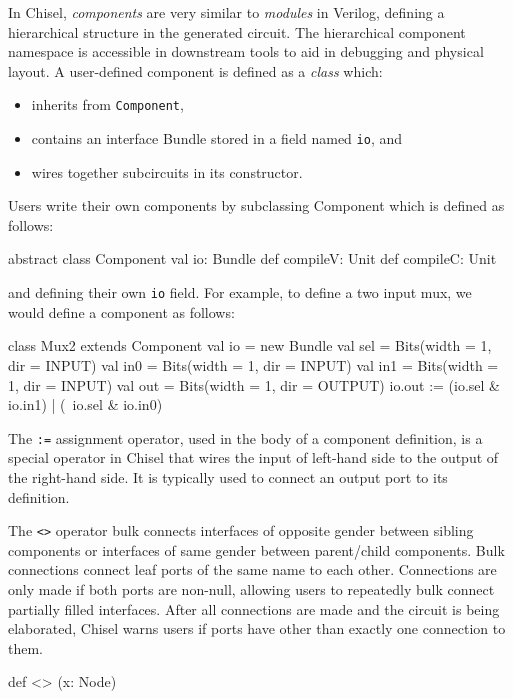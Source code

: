 \documentclass[10pt,twocolumn]{article}
\def\code#1{{\small\tt #1}}
\begin{document}
In Chisel, {\em components} are very similar to {\em modules} in
Verilog, defining a hierarchical structure in the generated circuit.
The hierarchical component namespace is accessible in downstream tools
to aid in debugging and physical layout.  A user-defined component is
defined as a {\em class} which:
\begin{itemize}
\item inherits from \code{Component},
\item contains an interface Bundle stored in a field named \code{io}, and
\item wires together subcircuits in its constructor.
\end{itemize}

Users write their own components by subclassing Component which is
defined as follows:

\begin{scala}
abstract class Component {
  val io: Bundle
  def compileV: Unit
  def compileC: Unit
}
\end{scala}

\noindent
and defining their own \code{io} field.  For example, to define a two
input mux, we would define a component as follows:

\begin{scala}
class Mux2 extends Component {
  val io = new Bundle{
    val sel = Bits(width = 1, dir = INPUT)
    val in0 = Bits(width = 1, dir = INPUT)
    val in1 = Bits(width = 1, dir = INPUT)
    val out = Bits(width = 1, dir = OUTPUT)
  }
  io.out := (io.sel & io.in1) | (~io.sel & io.in0)
}
\end{scala}

\noindent
The \code{:=} assignment operator, used in the body of a
component definition, is a special operator in Chisel that wires the input of
left-hand side to the output of the right-hand side.  It is typically
used to connect an output port to its definition.

The \code{<>} operator bulk connects interfaces of opposite gender between
sibling components or interfaces of same gender between parent/child components. 
Bulk connections connect leaf ports of the same name to each other.
Connections are only made if both ports are non-null,
allowing users to repeatedly bulk connect partially filled interfaces.
After all connections are made and the circuit is being elaborated,
Chisel warns users if ports have other than exactly one connection to them.

\begin{scala}
def <> (x: Node)
\end{scala}
\end{document}
